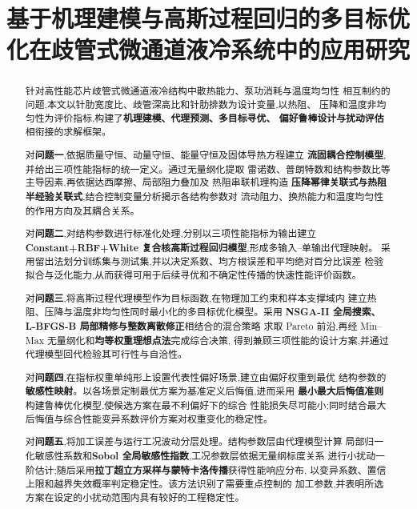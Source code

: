 \documentclass[withoutpreface,bwprint]{cumcmthesis} %
\title{{\strongfont\bfseries 基于机理建模与高斯过程回归的多目标优化在歧管式微通道液冷系统中的应用研究}} %
\newcommand{\absstrong}[1]{{\songbold\bfseries\boldmath #1}}
\begin{document}
\maketitle

\begin{abstract}
    针对高性能芯片歧管式微通道液冷结构中散热能力、泵功消耗与温度均匀性
    相互制约的问题,本文以针肋宽度比、歧管深高比和针肋排数为设计变量,以热阻、
    压降和温度非均匀性为评价指标,构建了\absstrong{机理建模、代理预测、多目标寻优、
        偏好鲁棒设计与扰动评估}相衔接的求解框架。

    对\absstrong{问题一},依据质量守恒、动量守恒、能量守恒及固体导热方程建立
    \absstrong{流固耦合控制模型},并给出三项性能指标的统一定义。通过无量纲化提取
    雷诺数、普朗特数和结构参数比等主导因素,再依据达西摩擦、局部阻力叠加及
    热阻串联机理构造
    \absstrong{压降幂律关联式与热阻半经验关联式},结合控制变量分析揭示各结构参数对
    流动阻力、换热能力和温度均匀性的作用方向及其耦合关系。

    对\absstrong{问题二},对结构参数进行标准化处理,分别以三项性能指标为输出建立
    \absstrong{Constant+\allowbreak RBF+\allowbreak White 复合核高斯过程回归模型},形成多输入--单输出代理映射。
    采用留出法划分训练集与测试集,并以决定系数、均方根误差和平均绝对百分比误差
    检验拟合与泛化能力,从而获得可用于后续寻优和不确定性传播的快速性能评价函数。

    对\absstrong{问题三},将高斯过程代理模型作为目标函数,在物理加工约束和样本支撑域内
    建立热阻、压降与温度非均匀性同时最小化的多目标优化模型。采用
    \absstrong{NSGA-II 全局搜索、L-BFGS-B 局部精修与整数离散修正}相结合的混合策略
    求取 Pareto 前沿,再经 Min--Max 无量纲化和\absstrong{均等权重理想点法}完成综合决策,
    得到兼顾三项性能的设计方案,并通过代理模型回代检验其可行性与自洽性。

    对\absstrong{问题四},在指标权重单纯形上设置代表性偏好场景,建立由偏好权重到最优
    结构参数的\absstrong{敏感性映射}。以各场景定制最优方案为基准定义后悔值,进而采用
    \absstrong{最小最大后悔值准则}构建鲁棒优化模型,使候选方案在最不利偏好下的综合
    性能损失尽可能小;同时结合最大后悔值与综合性能变异系数评价方案对权重变化的稳定性。

    对\absstrong{问题五},将加工误差与运行工况波动分层处理。结构参数层由代理模型计算
    局部归一化敏感性系数和\absstrong{Sobol 全局敏感性指数},工况参数层依据无量纲标度关系
    进行小扰动一阶估计;随后采用\absstrong{拉丁超立方采样与蒙特卡洛传播}获得性能响应分布,
    以变异系数、置信上限和越界失效概率判定稳定性。该方法识别了需要重点控制的
    加工参数,并表明所选方案在设定的小扰动范围内具有较好的工程稳定性。

\end{abstract}
\end{document}
